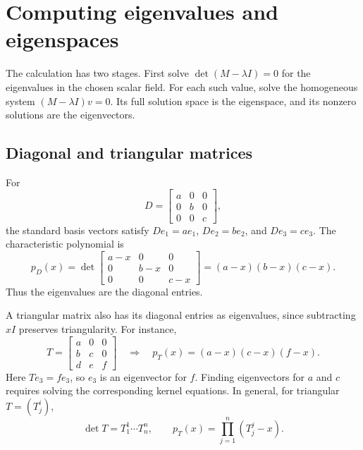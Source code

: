 \section{Computing eigenvalues and eigenspaces}
\label{sec:linear-algebra-i:computing-eigenspaces}

The calculation has two stages. First solve \(\det(M-\lambda I)=0\)
for the eigenvalues in the chosen scalar field. For each such value,
solve the homogeneous system \((M-\lambda I)v=0\). Its full solution
space is the eigenspace, and its nonzero solutions are the eigenvectors.

\subsection{Diagonal and triangular matrices}

\begin{example}
  For
  \[
    D=\begin{bmatrix}a&0&0\\0&b&0\\0&0&c\end{bmatrix},
  \]
  the standard basis vectors satisfy
  \(De_1=ae_1\), \(De_2=be_2\), and \(De_3=ce_3\).
  The characteristic polynomial is
  \[
    p_D(x)=\det\begin{bmatrix}
      a-x&0&0\\0&b-x&0\\0&0&c-x
    \end{bmatrix}=(a-x)(b-x)(c-x).
  \]
  Thus the eigenvalues are the diagonal entries.
\end{example}

A triangular matrix also has its diagonal entries as eigenvalues, since
subtracting \(xI\) preserves triangularity. For instance,
\[
  T=\begin{bmatrix}a&0&0\\b&c&0\\d&e&f\end{bmatrix}
  \quad\Longrightarrow\quad
  p_T(x)=(a-x)(c-x)(f-x).
\]
Here \(Te_3=fe_3\), so \(e_3\) is an eigenvector for \(f\).
Finding eigenvectors for \(a\) and \(c\) requires solving the corresponding
kernel equations. In general, for triangular \(T=(T^i_j)\),
\[
  \det T=T^1_1\cdots T^n_n,\qquad
  p_T(x)=\prod_{j=1}^n(T^j_j-x).
\]





